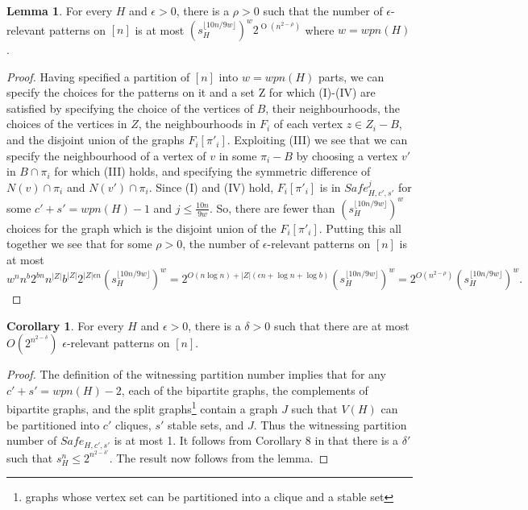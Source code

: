 \documentclass[12pt]{article}
\theoremstyle{definition}
\newtheorem{lemma}[theorem]{Lemma}
\newtheorem{corollary}[theorem]{Corollary}
\DeclareMathOperator{\bo}{O}
\begin{document}
\label{npatterns}
\begin{lemma}
 For every $H$ and $\epsilon>0$, there is a $\rho>0$ such that the number of $\epsilon$-relevant patterns  on 
 $[n]$ is at most $(s^{\lfloor 10n/9w \rfloor}_H)^w2^{\bo(n^{2-\rho})}$ where $w=wpn(H)$. 
\end{lemma}
\begin{proof} 
Having specified a partition of $[n]$ into $w=wpn(H)$ parts, we can specify the choices for the patterns on it and a set Z  for which  (I)-(IV) are satisfied 
 by specifying the choice of the vertices of $B$, their neighbourhoods, the choices of the vertices in $Z$, 
the neighbourhoods  in $F_i$ of each vertex  $z \in Z_i-B$, and the  disjoint union of the graphs $F_i[\pi'_i]$. 
 Exploiting (III) we see that we can specify the neighbourhood of a vertex of $v$ in some $\pi_i-B$  by choosing a 
vertex $v'$ in $B \cap \pi_i$ for which (III) holds, and specifying the symmetric difference of $N(v) \cap \pi_i$ and $N(v') \cap \pi_i$.
Since (I) and  (IV) hold,   $F_i[\pi'_i]$ is in $Safe^j_{H,c',s'}$ for some $c'+s'=wpn(H)-1$ and $j\le \frac{10n}{9w}$. So,  
there are fewer than $(s^{\lfloor 10n/9w \rfloor}_H)^w$ choices for the graph which is the disjoint 
union of the $F_i[\pi'_i]$. Putting this all together we see that for some $\rho>0$, the number of $\epsilon$-relevant patterns on $[n]$ is at most 
$$ w^nn^b2^{bn}n^{|Z|}b^{|Z|}2^{|Z|\epsilon n}(s^{\lfloor 10n/9w \rfloor}_H)^w =2^{O(n \log n)+|Z|(\epsilon n+\log n+\log b)} 
(s^{\lfloor 10n/9w \rfloor }_H)^w=2^{O(n^{2-\rho})} (s^{\lfloor 10n/9w \rfloor}_H)^w.$$ 
\end{proof}

\begin{corollary}
\label{firstbound}
 For every $H$ and $\epsilon>0$, there is a $\delta>0$ such that  there are  at most $O(2^{n^{2-\delta}})$ $\epsilon$-relevant patterns
 on $[n]$. 
\end{corollary}

\begin{proof}
The definition of the witnessing partition number implies that for any $c'+s'=wpn(H)-2$, each of the bipartite graphs, 
the complements of bipartite graphs, and the split graphs\footnote{graphs whose vertex set can be partitioned into a clique and a stable set} contain a graph $J$ such that $V(H)$ can be partitioned into $c'$ cliques, $s'$ stable sets, and 
$J$. Thus the witnessing partition number of $Safe_{H,c',s'}$ is at most 1.  It follows from Corollary 
8 in \cite{ABBM11} that there is a $\delta'$ such that $s^n_H \le 2^{n^{2-\delta'}}$. The result now follows from the lemma. 
\end{proof}
\end{document}
